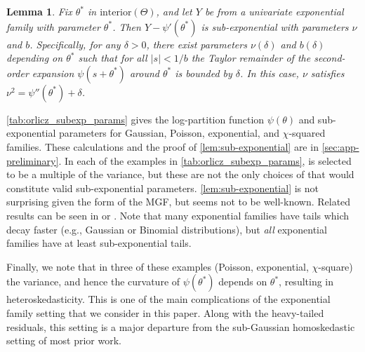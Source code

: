 \documentclass[ejs,noshowframe]{imsart}
\theoremstyle{plain}
\newtheorem{lemma}[theorem]{Lemma}
\theoremstyle{definition}
\begin{document}
\begin{lemma}
\label{lem:sub-exponential}
Fix $\theta^{*}$ in $\mathrm{interior}(\Theta)$, and let $Y$ be from a 
univariate
exponential family with parameter $\theta^{*}$. Then $Y - \psi'(\theta^*)$ is
sub-exponential with parameters $\nu$ and $b$.
Specifically, for any $\delta>0$, there exist parameters $\nu(\delta)$ and $b(\delta)$ depending on $\theta^*$ 
such that for all $|s| < 1/b$ the Taylor remainder of the second-order expansion $\psi(s + \theta^*)$ around $\theta^*$
is bounded by $\delta$. In this case, $\nu$ satisfies $\nu^2 = \psi''(\theta^*) + \delta$. 
\end{lemma}
\autoref{tab:orlicz_subexp_params} gives the log-partition function
$\psi(\theta)$ and sub-exponential parameters for Gaussian, Poisson,
exponential, and $\chi$-squared families. These calculations and the proof of
\autoref{lem:sub-exponential} are in
\autoref{sec:app-preliminary}.  In each of the examples in
\autoref{tab:orlicz_subexp_params},  is selected to be a 
multiple of the
variance, but these are not the only choices of  that would 
constitute
valid sub-exponential parameters. 
\autoref{lem:sub-exponential} is not surprising given the form of 
the MGF, but seems not to be well-known. Related results can be seen
in \cite{Brown1986} or \cite{KakadeShamir2010}. Note that many exponential
families have tails which decay faster (e.g., Gaussian or Binomial
distributions), but \emph{all} exponential families have at least sub-exponential tails.

Finally, we note that in three of these examples (Poisson, exponential, 
$\chi$-square) the variance, and hence the curvature of $\psi(\theta^*)$ depends 
on $\theta^*$, resulting in heteroskedasticity.
This is one of the main complications of the exponential family setting that we consider in this paper.
Along with the heavy-tailed residuals, this setting is a major departure from 
the sub-Gaussian homoskedastic setting of most prior work.
\end{document}
